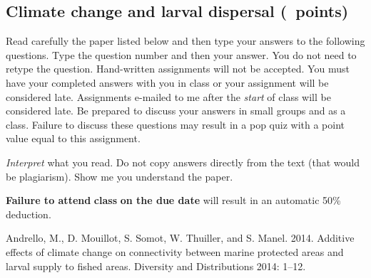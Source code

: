 \documentclass[12pt, addpoints]{exam}
\begin{document}
\subsection*{Climate change and larval dispersal (\numpoints\ points)}

Read carefully the paper listed below and then type your answers to the following questions.
Type the question number and then your answer. You do not need to retype the question. Hand-written
assignments will not be accepted. You must have your completed answers
with you in class or your assignment will be considered late. Assignments e-mailed to me after the \emph{start} of class will be
considered late. Be prepared to discuss your answers in small groups and as a class. Failure
to discuss these questions may result in a pop quiz with a point value
equal to this assignment.

\emph{Interpret} what you read. Do not copy answers directly from the text (that would
be plagiarism). Show me you understand the paper.

\textbf{Failure to attend} \textbf{class} \textbf{on the due date} will
result in an automatic 50\% deduction.

\begin{hangparas}{1.5em}{1}
Andrello, M., D. Mouillot, S. Somot, W. Thuiller, and S. Manel. 2014. Additive effects of climate change on connectivity between marine protected areas and larval supply to fished areas. Diversity and Distributions 2014: 1--12.

\end{hangparas}
\end{document}
